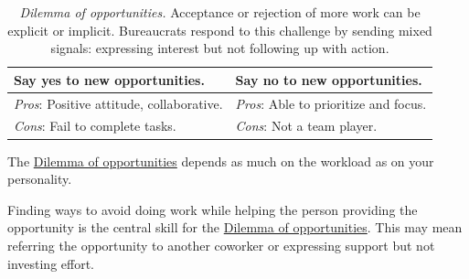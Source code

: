 \begin{center}
\begin{table}[H] %
\begin{tabular}{ | m{\dilemmatablewidth}| m{\dilemmatablewidth} | } 
  \hline
  \textbf{Say yes to new opportunities.} & 
  \textbf{Say no to new opportunities.} \\ 
  \hline
  \textit{Pros}: Positive attitude, collaborative. &
  \textit{Pros}: Able to prioritize and focus. \\
  \hline
  \textit{Cons}: Fail to complete tasks. &
  \textit{Cons}: Not a team player. \\  
  \hline
\end{tabular}
\caption{
\textit{Dilemma of opportunities.}
Acceptance or rejection of more work can be explicit or implicit. Bureaucrats respond to this challenge by sending mixed signals: expressing interest but not following up with action.
}
\label{table:dilemma-new-opportunties-yes-no}
\end{table}
\end{center}

The \hyperref[table:dilemma-new-opportunties-yes-no]{Dilemma of opportunities} depends as much on the workload as on your personality. 

Finding ways to avoid doing work while helping the person providing the opportunity is the central skill for the \hyperref[table:dilemma-new-opportunties-yes-no]{Dilemma of opportunities}. This may mean referring the opportunity to another coworker or expressing support but not investing effort. 



